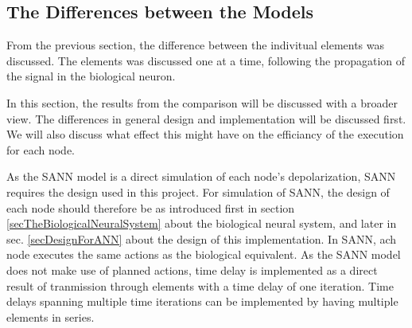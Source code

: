%
%
%
%
%

%



		\subsection{The Differences between the Models} %
		From the previous section, the difference between the indivitual elements was discussed. 
		The elements was discussed one at a time, following the propagation of the signal in the biological neuron.

		In this section, the results from the comparison will be discussed with a broader view.
		The differences in general design and implementation will be discussed first.
		We will also discuss what effect this might have on the efficiancy of the execution for each node.


		As the SANN model is a direct simulation of each node's depolarization, SANN requires the design used in this project.
		For simulation of SANN, the design of each node should therefore be as introduced first in section \ref{secTheBiologicalNeuralSystem} about the biological neural system, 
			and later in sec. \ref{secDesignForANN} about the design of this implementation.
		In SANN, ach node executes the same actions as the biological equivalent.
		As the SANN model does not make use of planned actions, time delay is implemented as a direct result of tranmission through elements with a time delay of one iteration.
		Time delays spanning multiple time iterations can be implemented by having multiple elements in series.

